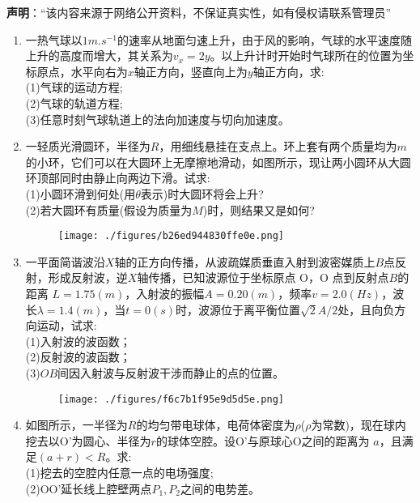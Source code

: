

\textbf{声明}：“该内容来源于网络公开资料，不保证真实性，如有侵权请联系管理员”

\begin{enumerate}
\item 一热气球以$1m.s^{-1}$的速率从地面匀速上升，由于风的影响，气球的水平速度随上升的高度而增大，其关系为$v_x=2y$。以上升计时开始时气球所在的位置为坐标原点，水平向右为$x$轴正方向，竖直向上为$y$轴正方向，求:\\
(1)气球的运动方程;\\
(2)气球的轨道方程;\\
(3)任意时刻气球轨道上的法向加速度与切向加速度。
\item 一轻质光滑圆环，半径为$R$，用细线悬挂在支点上。环上套有两个质量均为$m$的小环，它们可以在大圆环上无摩擦地滑动，如图所示，现让两小圆环从大圆环顶部同时由静止向两边下滑。试求:\\
(1)小圆环滑到何处(用$\theta$表示)时大圆环将会上升?\\
(2)若大圆环有质量(假设为质量为$M$)时，则结果又是如何?
\begin{figure}[ht]
\centering
\texttt{[image: ./figures/b26ed944830ffe0e.png]}
\caption{} \label{fig_XD12_1}
\end{figure}
\item 一平面简谐波沿$X$轴的正方向传播，从波疏媒质垂直入射到波密媒质上$B$点反射，形成反射波，逆$X$轴传播，已知波源位于坐标原点 O，O 点到反射点$B$的距离 $L=1.75(m)$，入射波的振幅$A=0.20(m)$，频率$v=2.0(Hz)$，波长$\lambda=1.4(m)$，当$t=0(s)$时，波源位于离平衡位置$\sqrt{2}A/2$处，且向负方向运动，试求:\\
(1)入射波的波函数；\\
(2)反射波的波函数；\\
(3)$OB$间因入射波与反射波干涉而静止的点的位置。
\begin{figure}[ht]
\centering
\texttt{[image: ./figures/f6c7b1f95e9d5d5e.png]}
\caption{} \label{fig_XD12_2}
\end{figure}
\item 如图所示，一半径为$R$的均匀带电球体，电荷体密度为$\rho$($\rho$为常数)，现在球内挖去以O'为圆心、半径为$r$的球体空腔。设O'与原球心O之间的距离为 $a$，且满足$(a+r)<R$。求:\\
(1)挖去的空腔内任意一点的电场强度;\\
(2)OO'延长线上腔壁两点$P_1,P_2$之间的电势差。
\begin{figure}[ht]

\end{figure}
\end{enumerate}

